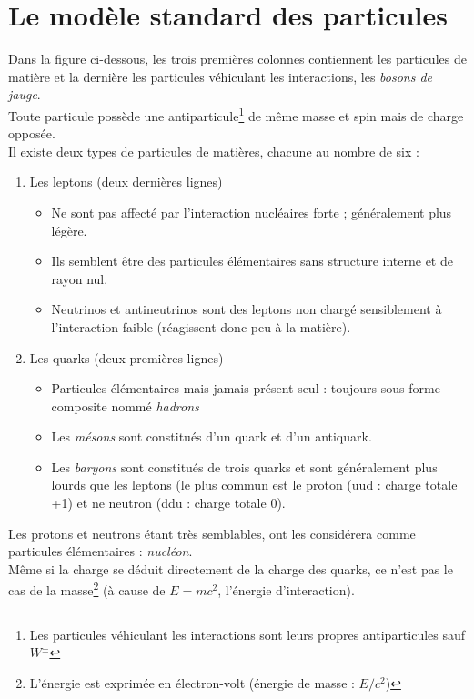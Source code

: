 \documentclass	[11pt, a4paper, openany]{book}
\begin{document}
	\section{Le modèle standard des particules}
	Dans la figure ci-dessous, les trois premières colonnes contiennent les particules de matière et la dernière les particules véhiculant les interactions, les \textit{bosons de jauge}.\\
	Toute particule possède une antiparticule\footnote{Les particules véhiculant les interactions sont leurs propres antiparticules sauf $W^\pm$} de même masse et spin mais de charge opposée.\\
	
	Il existe deux types de particules de matières, chacune au nombre de six : 
	\begin{enumerate}
		\item Les leptons (deux dernières lignes)
		      \begin{itemize}
		      	\item Ne sont pas affecté par l'interaction nucléaires forte ; généralement plus légère.
		      	\item Ils semblent être des particules élémentaires sans structure interne et de rayon nul.
		      	\item Neutrinos et antineutrinos sont des leptons non chargé sensiblement à l'interaction faible (réagissent donc peu à la matière).
		      \end{itemize} 
		\item Les quarks (deux premières lignes)
		      \begin{itemize}
		      	\item Particules élémentaires mais jamais présent seul : toujours sous forme composite nommé \textit{hadrons}
		      	\item Les \textit{mésons} sont constitués d'un quark et d'un antiquark.
		      	\item Les \textit{baryons} sont constitués de trois quarks et sont généralement plus lourds que les leptons (le plus commun est le proton (uud : charge totale +1) et ne neutron (ddu : charge totale 0).
		      \end{itemize}
	\end{enumerate}
	Les protons et neutrons étant très semblables, ont les considérera comme particules élémentaires : \textit{nucléon}.\\
	Même si la charge se déduit directement de la charge des quarks, ce n'est pas le cas de la masse\footnote{L'énergie est exprimée en électron-volt (énergie de masse : $E/c^2$)} (à cause de $E = mc^2$, l'énergie d'interaction).\\
	
\end{document}
